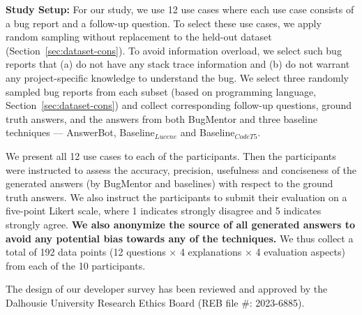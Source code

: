 \textbf{Study Setup:} For our study, we use 12 use cases where each use case consists of a bug report and a follow-up question. To select these use cases, we apply random sampling without replacement to the held-out dataset (Section~\ref{sec:dataset-cons}). To avoid information overload, we select such bug reports that (a) do not have any stack trace information and (b) do not warrant any project-specific knowledge to understand the bug. We select three randomly sampled bug reports from each subset (based on programming language, Section~\ref{sec:dataset-cons}) and collect corresponding follow-up questions, ground truth answers, and the answers from both BugMentor and three baseline techniques --- AnswerBot, Baseline$_{Lucene}$ and Baseline$_{CodeT5}$.\par

We present all 12 use cases to each of the participants. Then the participants were instructed to assess the accuracy, precision, usefulness and conciseness of the generated answers (by BugMentor and baselines) with respect to the ground truth answers. We also instruct the participants to submit their evaluation on a five-point Likert scale, where 1 indicates strongly disagree and 5 indicates strongly agree. \textbf{We also anonymize the source of all generated answers to avoid any potential bias towards any of the techniques.}
We thus collect a total of  192 data points (12 questions × 4 explanations × 4 evaluation aspects) from each of the 10 participants.\par

The design of our developer survey has been reviewed and approved by the Dalhousie University Research Ethics Board (REB file \#: 2023-6885).\par

